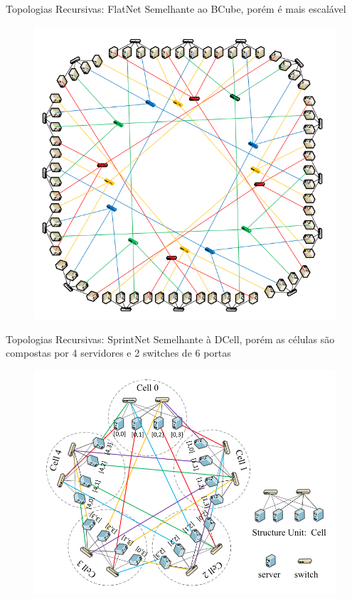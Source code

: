 \documentclass[aspectratio=169]{beamer}
\begin{document}
		\begin{frame} {Topologias Recursivas: FlatNet}
			Semelhante ao BCube, porém é mais escalável
			\begin{figure}[ht]    
				\includegraphics[scale=0.3]{imagens/flatnet.png}
				\label{fig:sample_figure}
			\end{figure}
		\end{frame}

		\begin{frame} {Topologias Recursivas: SprintNet}
			Semelhante à DCell, porém as células são compostas por 4 servidores e 2 switches de 6 portas
			\begin{figure}[ht]    
				\includegraphics[scale=0.3]{imagens/springnet.png}
				\label{fig:sample_figure}
			\end{figure}
		\end{frame}
\end{document}
